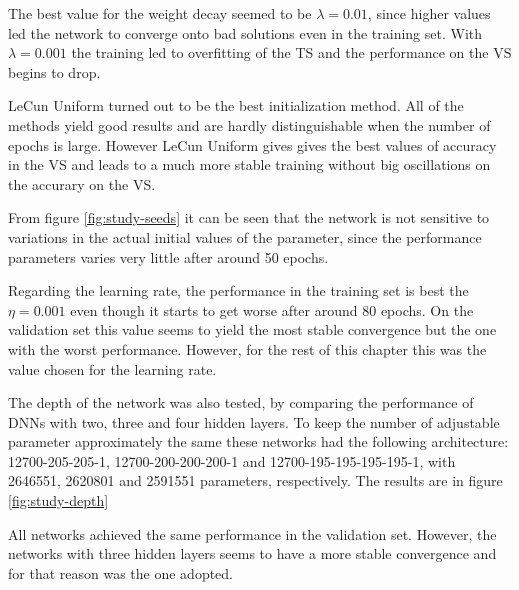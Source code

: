 \documentclass{article}
\begin{document}
The best value for the weight decay seemed to be $\lambda = 0.01$, since higher values led the network to converge onto bad solutions even in the training set. With $\lambda = 0.001$ the training led to overfitting of the TS and the performance on the VS begins to drop.

LeCun Uniform turned out to be the best initialization method. All of the methods yield good results and are hardly distinguishable when the number of epochs is large. However LeCun Uniform gives gives the best values of accuracy in the VS and leads to a much more stable training without big oscillations on the accurary on the VS.

From figure \ref{fig:study-seeds} it can be seen that the network is not sensitive to variations in the actual initial values of the parameter, since the performance parameters varies very little after around 50 epochs.

Regarding the learning rate, the performance in the training set is best the $\eta = 0.001$ even though it starts to get worse after around 80 epochs. On the validation set this value seems to yield the most stable convergence but the one with the worst performance. However, for the rest of this chapter this was the value chosen for the learning rate.

The depth of the network was also tested, by comparing the performance of DNNs with two, three and four hidden layers. To keep the number of adjustable parameter approximately the same these networks had the following architecture:
12700-205-205-1, 12700-200-200-200-1 and 12700-195-195-195-195-1, with 2646551, 2620801 and 2591551 parameters, respectively. The results are in figure \ref{fig:study-depth}

All networks achieved the same performance in the validation set. However, the networks with three hidden layers seems to have a more stable convergence and for that reason was the one adopted.
\end{document}
